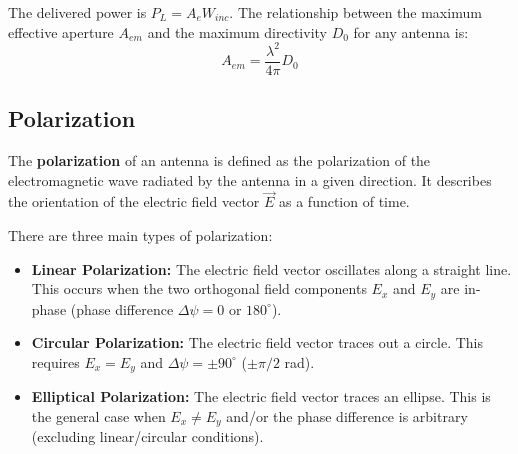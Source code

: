 \documentclass[12pt,a4paper]{article}
\begin{document}
\begin{tcolorbox}[formulabox, title={\textbf{Effective Aperture and Directivity Relation}}]
The delivered power is $P_L = A_e W_{inc}$. The relationship between the maximum effective aperture $A_{em}$ and the maximum directivity $D_0$ for any antenna is:
\[
A_{em} = \frac{\lambda^2}{4\pi} D_0
\]
\end{tcolorbox}

\subsection{Polarization}
The \textbf{polarization} of an antenna is defined as the polarization of the electromagnetic wave radiated by the antenna in a given direction. It describes the orientation of the electric field vector $\vec{E}$ as a function of time.

There are three main types of polarization:
\begin{itemize}[leftmargin=*, itemsep=3pt]
  \item \textbf{Linear Polarization:} The electric field vector oscillates along a straight line. This occurs when the two orthogonal field components $E_x$ and $E_y$ are in-phase (phase difference $\Delta \psi = 0$ or $180^\circ$).
  \item \textbf{Circular Polarization:} The electric field vector traces out a circle. This requires $E_x = E_y$ and $\Delta \psi = \pm 90^\circ$ ($\pm \pi/2$ rad).
  \item \textbf{Elliptical Polarization:} The electric field vector traces an ellipse. This is the general case when $E_x \neq E_y$ and/or the phase difference is arbitrary (excluding linear/circular conditions).
\end{itemize}
\end{document}
